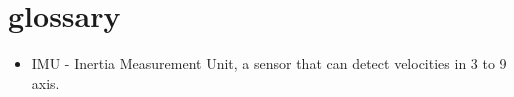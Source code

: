 \section{glossary}
\begin{itemize}
\item \label{trm::imu} IMU - Inertia Measurement Unit, a sensor that can detect velocities in 3 to 9 axis.
\end{itemize}